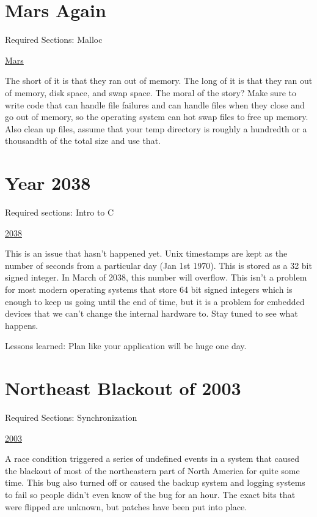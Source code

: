 \section{Mars Again}
\label{pm:mars_memory}

Required Sections: Malloc

\href{https://www.computerworld.com/article/2574759/data-storage-solutions/out-of-memory-problem-caused-mars-rover-s-glitch.html}{Mars}

The short of it is that they ran out of memory. The long of it is that they ran out of memory, disk space, and swap space. The moral of the story? Make sure to write code that can handle file failures and can handle files when they close and go out of memory, so the operating system can hot swap files to free up memory. Also clean up files, assume that your temp directory is roughly a hundredth or a thousandth of the total size and use that.

\section{Year 2038}
\label{pm:y2038}

Required sections: Intro to C

\href{https://en.wikipedia.org/wiki/Year_2038_problem}{2038}

This is an issue that hasn't happened yet.
Unix timestamps are kept as the number of seconds from a particular day (Jan 1st 1970).
This is stored as a 32 bit signed integer.
In March of 2038, this number will overflow.
This isn't a problem for most modern operating systems that store 64 bit signed integers which is enough to keep us going until the end of time, but it is a problem for embedded devices that we can't change the internal hardware to.
Stay tuned to see what happens.

Lessons learned: Plan like your application will be huge one day.

\section{Northeast Blackout of 2003}
\label{pm:blackout2003}

Required Sections: Synchronization

\href{https://en.wikipedia.org/wiki/Northeast_blackout_of_2003}{2003}

A race condition triggered a series of undefined events in a system that caused the blackout of most of the northeastern part of North America for quite some time.
This bug also turned off or caused the backup system and logging systems to fail so people didn't even know of the bug for an hour. The exact bits that were flipped are unknown, but patches have been put into place.

